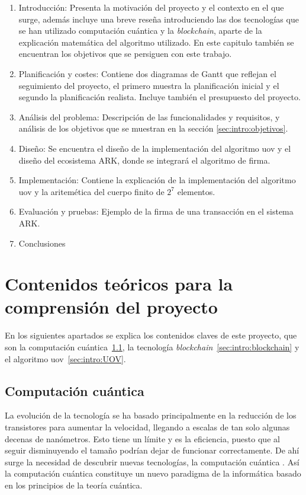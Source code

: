 \begin{enumerate}
	\item Introducción: Presenta la motivación del proyecto y el contexto en el que surge, además incluye una breve reseña introduciendo las dos tecnologías que se han utilizado computación cuántica y la \textit{blockchain}, aparte de la explicación matemática del algoritmo utilizado. En este capitulo también se encuentran los objetivos que se persiguen con este trabajo.
	\item Planificación y costes: Contiene dos diagramas de Gantt que reflejan el seguimiento del proyecto, el primero muestra la planificación inicial y el segundo la planificación realista. Incluye también el presupuesto del proyecto.
	\item Análisis del problema: Descripción de las funcionalidades y requisitos, y análisis de los objetivos que se muestran en la sección \ref{sec:intro:objetivos}.
	\item Diseño: Se encuentra el diseño de la implementación del algoritmo \acrshort{uov} y el diseño del ecosistema ARK, donde se integrará el algoritmo de firma.
	\item Implementación: Contiene la explicación de la implementación del algoritmo \acrshort{uov} y la aritemética del cuerpo finito de $2^7$ elementos.
	\item Evaluación y pruebas: Ejemplo de la firma de una transacción en el sistema ARK.
	\item Conclusiones
\end{enumerate}

\section{Contenidos teóricos para la comprensión del proyecto}

En los siguientes apartados se explica los contenidos claves de este proyecto, que son la computación cuántica\ \ref{sec:intro:cc}, la tecnología \textit{blockchain}\ \ref{sec:intro:blockchain} y el algoritmo \acrshort{uov}\ \ref{sec:intro:UOV}.

\subsection{Computación cuántica}\label{sec:intro:cc}

La evolución de la tecnología se ha basado principalmente en la reducción de los transistores para aumentar la velocidad, llegando a escalas de tan solo algunas decenas de nanómetros. Esto tiene un límite y es la eficiencia, puesto que al seguir disminuyendo el tamaño podrían dejar de funcionar correctamente. De ahí surge la necesidad de descubrir nuevas tecnologías, la computación cuántica \cite{computacion-cuantica-wiki}. Así la computación cuántica constituye un nuevo paradigma de la informática basado en los principios de la teoría cuántica.\\


